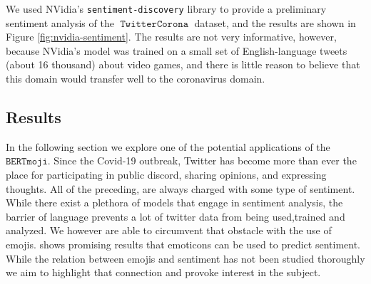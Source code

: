 \documentclass[11pt]{article}
\newcommand{\bertmoji}{\texttt{BERTmoji}}
\DeclareMathOperator{\corona}{\texttt{TwitterCorona}}
\begin{document}
We used NVidia's \texttt{sentiment-discovery} library to provide a preliminary sentiment analysis of the $\corona$ dataset,
and the results are shown in Figure \ref{fig:nvidia-sentiment}.
The results are not very informative, however, because NVidia's model was trained on a small set of English-language tweets (about 16 thousand) about video games,
and there is little reason to believe that this domain would transfer well to the coronavirus domain.


\subsection{Results}

In the following section we explore one of the potential applications of the $\bertmoji$.
Since the Covid-19 outbreak, Twitter has become more than ever the place for participating in public discord, 
sharing opinions, and expressing thoughts. All of the preceding, are always charged with some type of sentiment.
While there exist a plethora of models that engage in sentiment analysis, the barrier of language prevents a lot 
of twitter data from being used,trained and analyzed. We however are able to circumvent that obstacle with the use of emojis.
\cite{CAN_EMOTICONS_BE_USED_TO_PREDICT_SENTIMENT} shows promising results that emoticons can be used to predict sentiment. 
While the relation between emojis and sentiment has not been studied thoroughly we aim to highlight that connection and 
provoke interest in the subject.
\end{document}
